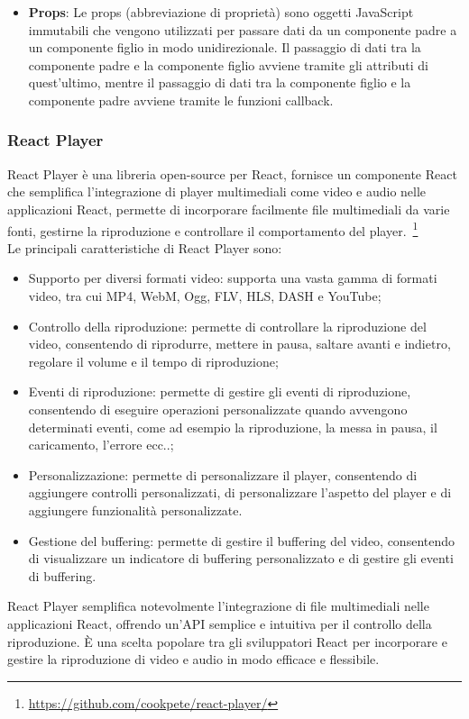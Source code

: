\begin{itemize}
\item \textbf{Props}:
Le props (abbreviazione di proprietà) sono oggetti JavaScript immutabili che vengono utilizzati per passare dati da un componente padre a un componente figlio in modo unidirezionale.
Il passaggio di dati tra la componente padre e la componente figlio avviene tramite gli attributi di quest'ultimo, mentre il passaggio di dati tra la componente figlio e la componente padre avviene tramite le funzioni callback.\\
    \end{itemize}
\subsubsection{React Player}
React Player è una libreria open-source per React, fornisce un componente React che semplifica l'integrazione di player multimediali come video e audio nelle applicazioni React, permette di incorporare facilmente file multimediali da varie fonti, gestirne la riproduzione e controllare il comportamento del player.~\footnote{\url{https://github.com/cookpete/react-player/}}\\
Le principali caratteristiche di React Player sono:
\begin{itemize}
    \item{Supporto per diversi formati video}: supporta una vasta gamma di formati video, tra cui MP4, WebM, Ogg, FLV, HLS, DASH e YouTube;
    \item{Controllo della riproduzione}: permette di controllare la riproduzione del video, consentendo di riprodurre, mettere in pausa, saltare avanti e indietro, regolare il volume e il tempo di riproduzione;
    \item{Eventi di riproduzione}: permette di gestire gli eventi di riproduzione, consentendo di eseguire operazioni personalizzate quando avvengono determinati eventi, come ad esempio la riproduzione, la messa in pausa, il caricamento, l'errore ecc..;
    \item{Personalizzazione}: permette di personalizzare il player, consentendo di aggiungere controlli personalizzati, di personalizzare l'aspetto del player e di aggiungere funzionalità personalizzate.
    \item{Gestione del buffering}: permette di gestire il buffering del video, consentendo di visualizzare un indicatore di buffering personalizzato e di gestire gli eventi di buffering.
\end{itemize}
React Player semplifica notevolmente l'integrazione di file multimediali nelle applicazioni React, offrendo un'API semplice e intuitiva per il controllo della riproduzione. È una scelta popolare tra gli sviluppatori React per incorporare e gestire la riproduzione di video e audio in modo efficace e flessibile.\\
